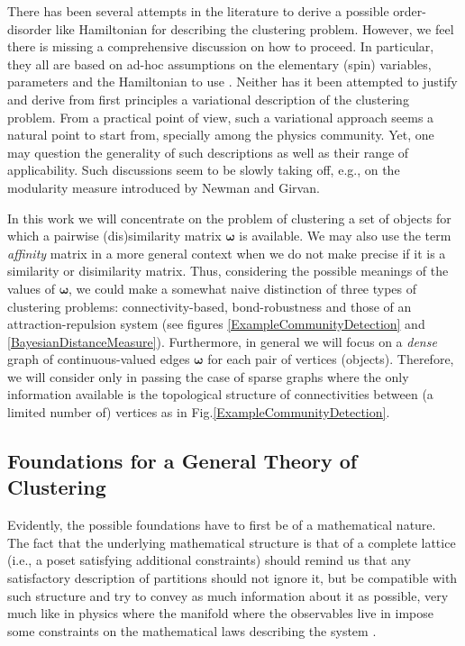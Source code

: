 \documentclass[twocolumn,aps,sort,nofootinbib]{revtex4}
\begin{document}
There has been several attempts in the literature to derive a possible
order-disorder like Hamiltonian for describing the clustering problem.
However, we feel there is missing a comprehensive discussion on how
to proceed. In particular, they all are based on ad-hoc assumptions on
the elementary (spin) variables, parameters and the Hamiltonian 
to use \cite{Reichardt06,Massen06}.
Neither has it been attempted to justify and derive from first principles
a variational description of the clustering problem. From a practical
point of view, such a variational approach seems a natural point to start from, specially among
the physics community. Yet, one may question the generality of such
descriptions as well as their range of applicability. 
Such discussions
seem to be slowly taking off, e.g., on the modularity measure introduced 
by Newman and Girvan\cite{Newman04,Danon05,Fortunato07,Good10}.

In this work we will concentrate on the problem of clustering a set
of objects for which a pairwise (dis)similarity matrix $\boldsymbol{\omega}$ 
is available.
We may also use the term {\sl affinity} matrix 
in a more general context when we do not make precise if it is
a similarity or disimilarity matrix.
Thus, considering the possible meanings of the values of $\boldsymbol{\omega}$,
we could make a somewhat naive distinction of three types of clustering
problems: connectivity-based, bond-robustness and those of an
attraction-repulsion system (see 
figures \ref{ExampleCommunityDetection} and \ref{BayesianDistanceMeasure}).
Furthermore, in general we will focus on
a {\sl dense} graph of continuous-valued edges $\boldsymbol{\omega}$
for each pair of vertices (objects). 
Therefore, we will consider only in passing the case
of sparse graphs where the only information available is the topological
structure of connectivities 
between (a limited number of) vertices as in Fig.\ref{ExampleCommunityDetection}.

\subsection{Foundations for a General Theory of Clustering}
Evidently, the possible foundations have to first be of a mathematical 
nature. 
The fact that the underlying mathematical structure is that of a 
complete lattice (i.e., a poset satisfying additional constraints)
should remind us that any satisfactory description of partitions should not
ignore it, but be compatible
with such structure and try to convey as much information about it as
possible\cite{Knuth04,Goyal10,Goyal11,Ellerman09,Ellerman10}, very much like in physics where
the manifold where the observables live in impose some constraints on the
mathematical laws describing the system \cite{Tarantola}. 
\end{document}
